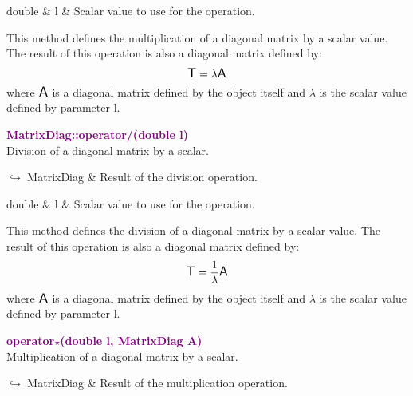 \begin{tcolorbox}[width=\textwidth,myArgs,tabularx={ll|R}]
double & l & Scalar value to use for the operation.
\end{tcolorbox}

This method defines the multiplication of a diagonal matrix by a scalar value.
The result of this operation is also a diagonal matrix defined by:
\begin{equation*}
\mbox{\large\ensuremath{\mathsf{T}}} = \lambda \mbox{\large\ensuremath{\mathsf{A}}}
\end{equation*}
where $\mbox{\large\ensuremath{\mathsf{A}}}$ is a diagonal matrix defined by the object itself and $\lambda$ is the scalar value defined by parameter l.

\textcolor{purple}{\textbf{MatrixDiag::operator/(double l)}}\label{MatrixDiag::operator/(double l)}\\
Division of a diagonal matrix by a scalar.\vspace*{-0.5em}
\begin{tcolorbox}[grow to left by=-1cm, width=\textwidth-1cm,myArgs,tabularx={l|R}]
$\hookrightarrow$ MatrixDiag & Result of the division operation.
\end{tcolorbox}

\begin{tcolorbox}[width=\textwidth,myArgs,tabularx={ll|R}]
double & l & Scalar value to use for the operation.
\end{tcolorbox}

This method defines the division of a diagonal matrix by a scalar value.
The result of this operation is also a diagonal matrix defined by:
\begin{equation*}
\mbox{\large\ensuremath{\mathsf{T}}} = \frac{1}{\lambda} \mbox{\large\ensuremath{\mathsf{A}}}
\end{equation*}
where $\mbox{\large\ensuremath{\mathsf{A}}}$ is a diagonal matrix defined by the object itself and $\lambda$ is the scalar value defined by parameter l.

\textcolor{purple}{\textbf{operator$\star$(double l, MatrixDiag A)}}\label{operator*(double l, MatrixDiag A)}\\
Multiplication of a diagonal matrix by a scalar.\vspace*{-0.5em}
\begin{tcolorbox}[grow to left by=-1cm, width=\textwidth-1cm,myArgs,tabularx={l|R}]
$\hookrightarrow$ MatrixDiag & Result of the multiplication operation.
\end{tcolorbox}

